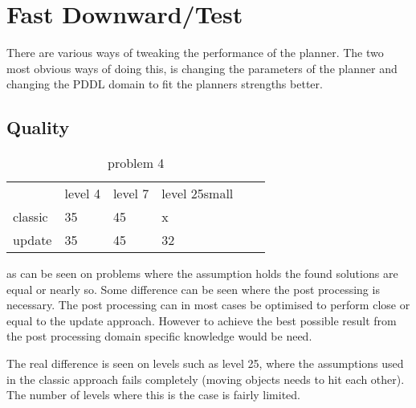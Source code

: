 \section{Fast Downward/Test}

%
%
%
%
%
%
%



	


	There are various ways of tweaking the performance of the planner. The two most obvious ways of doing this, is changing the parameters of the planner and changing the PDDL domain to fit the planners strengths better.

		\subsection{Quality}
		
			
						\begin{table}[h]
							\centering
							\caption{problem 4}
							\label{prob4}
							\begin{tabular}{llllll}
								& level 4 & level 7  & level 25small\\
								classic & 35 & 45 & x\\
								update& 35 &45& 32\\
							\end{tabular}
						\end{table}
			
			as can be seen on problems where the assumption holds the found solutions are equal or nearly so. Some difference can be seen where the post processing is necessary. The post processing can in most cases be optimised to perform close or equal to the update approach. However to achieve the best possible result from the post processing domain specific knowledge would be need.
			
			The real difference is seen on levels such as level 25, where the assumptions used in the classic approach fails completely (moving objects needs to hit each other). The number of levels where this is the case is fairly limited.
			
